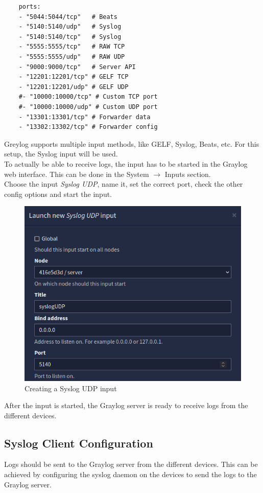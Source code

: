 \begin{verbatim}
    ports:
    - "5044:5044/tcp"   # Beats
    - "5140:5140/udp"   # Syslog
    - "5140:5140/tcp"   # Syslog
    - "5555:5555/tcp"   # RAW TCP
    - "5555:5555/udp"   # RAW UDP
    - "9000:9000/tcp"   # Server API
    - "12201:12201/tcp" # GELF TCP
    - "12201:12201/udp" # GELF UDP
    #- "10000:10000/tcp" # Custom TCP port
    #- "10000:10000/udp" # Custom UDP port
    - "13301:13301/tcp" # Forwarder data
    - "13302:13302/tcp" # Forwarder config    
\end{verbatim}

Greylog supports multiple input methods, like GELF, Syslog, Beats, etc. For this setup, the Syslog input will be used. \\
To actually be able to receive logs, the input has to be started in the Graylog web interface. This can be done in the System $\rightarrow$ Inputs section.\\
Choose the input \textit{Syslog UDP}, name it, set the correct port, check the other config options and start the input.
\begin{figure}[H]
	\centering
	\includegraphics[width=0.8\linewidth]{Figures/syslog-udp-input.png}
	\caption{Creating a Syslog UDP input}
\end{figure}

After the input is started, the Graylog server is ready to receive logs from the different devices.

\subsection{Syslog Client Configuration}

Logs should be sent to the Graylog server from the different devices. This can be achieved by configuring the syslog daemon on the devices to send the logs to the Graylog server.

